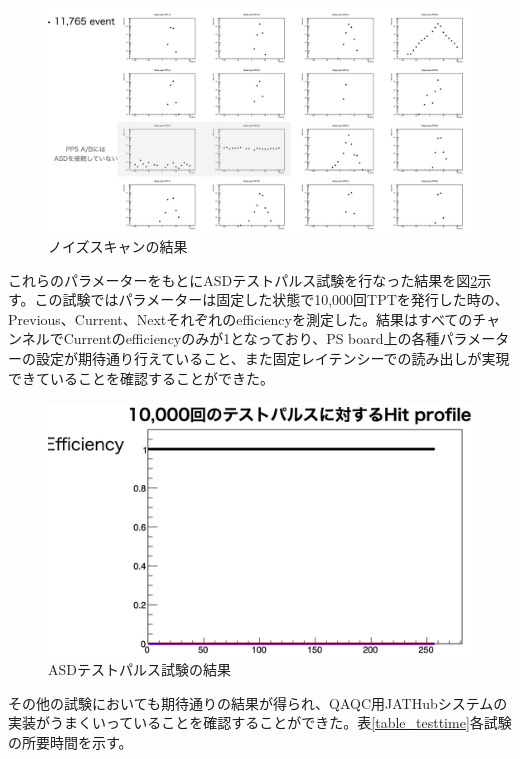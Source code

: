 \begin{figure} 
\centering
\includegraphics[width=16cm]{fig/QAQC/QAQCnoisescan.png}
\caption[ノイズスキャン]{ノイズスキャンの結果}
\label{QAQCnoisescan}
\end{figure}

これらのパラメーターをもとにASDテストパルス試験を行なった結果を図\ref{QAQCresult}示す。この試験ではパラメーターは固定した状態で10,000回TPTを発行した時の、Previous、Current、Nextそれぞれのefficiencyを測定した。結果はすべてのチャンネルでCurrentのefficiencyのみが1となっており、PS board上の各種パラメーターの設定が期待通り行えていること、また固定レイテンシーでの読み出しが実現できていることを確認することができた。

\begin{figure} 
\centering
\includegraphics[width=16cm]{fig/QAQC/QAQCresult.png}
\caption[ASDテストパルスの結果]{ASDテストパルス試験の結果}
\label{QAQCresult}
\end{figure}

その他の試験においても期待通りの結果が得られ、QAQC用JATHubシステムの実装がうまくいっていることを確認することができた。表\ref{table_testtime}各試験の所要時間を示す。

